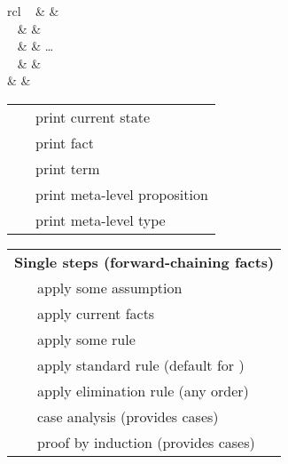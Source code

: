 \begin{isabellebody}
\begin{isamarkuptext}
\begin{matharray}{rcl}
    \mbox{}~ & \approx & \mbox{}~ \\
    \mbox{}~ & \approx & \mbox{}~~\mbox{}~ \\
    \mbox{}~ & \approx & \dots~\mbox{}~~\mbox{}~ \\
    \mbox{}~ & \approx & \mbox{}~~\mbox{}~ \\
    \mbox{} & \approx & \mbox{}~ \\
  \end{matharray}%
\end{isamarkuptext}%
\isamarkuptrue%
%
\isamarkuptrue%
%
\begin{isamarkuptext}%
\begin{tabular}{ll}
    \mbox{\isa{\isacommand{pr}}} & print current state \\
    \mbox{\isa{\isacommand{thm}}}~\isa{a} & print fact \\
    \mbox{\isa{\isacommand{term}}}~\isa{t} & print term \\
    \mbox{\isa{\isacommand{prop}}}~\isa{{\isasymphi}} & print meta-level proposition \\
    \mbox{\isa{\isacommand{typ}}}~\isa{{\isasymtau}} & print meta-level type \\
  \end{tabular}%
\end{isamarkuptext}%
\isamarkuptrue%
%
\isamarkuptrue%
%
\begin{isamarkuptext}%
\begin{tabular}{ll}
    \multicolumn{2}{l}{\textbf{Single steps (forward-chaining facts)}} \\[0.5ex]
    \mbox{\isa{assumption}} & apply some assumption \\
    \mbox{\isa{this}} & apply current facts \\
    \mbox{\isa{rule}}~\isa{a} & apply some rule  \\
    \mbox{\isa{rule}} & apply standard rule (default for \mbox{\isa{\isacommand{proof}}}) \\
    \mbox{\isa{contradiction}} & apply \isa{{\isasymnot}} elimination rule (any order) \\
    \mbox{\isa{cases}}~\isa{t} & case analysis (provides cases) \\
    \mbox{\isa{induct}}~\isa{x} & proof by induction (provides cases) \\[2ex]


\end{tabular}
\end{isamarkuptext}
\end{isabellebody}
